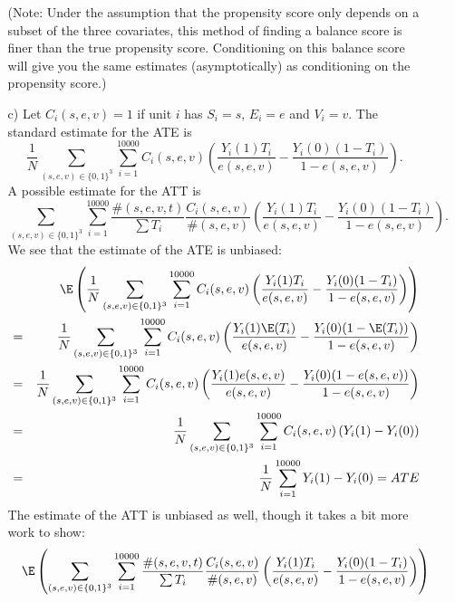 \documentclass{article}
\begin{document}
\begin{itemize}
\begin{itemize}
      (Note: Under the assumption that the propensity score only depends on a subset of
      the three covariates, this method of finding a balance
      score is finer than the true propensity score.  
      Conditioning on this balance score will give you the same estimates (asymptotically)
      as conditioning on the propensity score.)
    \item[c)]
      Let $C_i(s,e,v) = 1$ if unit $i$ has $S_i = s$, $E_i = e$ and $V_i = v$.
      The standard estimate for the ATE is
      $$
        \frac 1 N\sum_{(s,e,v) \in \{0,1\}^3}\sum_{i = 1}^{10000} C_{i}(s,e,v)\left(
          \frac{Y_i(1)T_i}{e(s,e,v)} - \frac{Y_i(0)(1-T_i)}{1- e(s,e,v)}
        \right).
      $$
      A possible estimate for the ATT is
      $$
       \sum_{(s,e,v) \in \{0,1\}^3}\sum_{i = 1}^{10000} \frac{\#(s,e,v,t)}{\sum T_i}\frac{C_{i}(s,e,v)}{\#(s,e,v)}\left(
          \frac{Y_i(1)T_i}{e(s,e,v)} - \frac{Y_i(0)(1-T_i)}{1- e(s,e,v)}
        \right).
      $$
      We see that the estimate of the ATE is unbiased:
      \begin{eqnarray*}
       && \E\left(\frac 1 N\sum_{(s,e,v) \in \{0,1\}^3}\sum_{i = 1}^{10000} C_{i}(s,e,v)\left(
          \frac{Y_i(1)T_i}{e(s,e,v)} - \frac{Y_i(0)(1-T_i)}{1- e(s,e,v)}
        \right)\right)\\
       &=&\frac 1 N\sum_{(s,e,v) \in \{0,1\}^3}\sum_{i = 1}^{10000} C_{i}(s,e,v)\left(
          \frac{Y_i(1)\E(T_i)}{e(s,e,v)} - \frac{Y_i(0)(1-\E(T_i))}{1- e(s,e,v)}
        \right)\\
      &=&\frac 1 N\sum_{(s,e,v) \in \{0,1\}^3}\sum_{i = 1}^{10000} C_{i}(s,e,v)\left(
          \frac{Y_i(1)e(s,e,v)}{e(s,e,v)} - \frac{Y_i(0)(1-e(s,e,v))}{1- e(s,e,v)}
        \right)\\
      &=&\frac 1 N\sum_{(s,e,v) \in \{0,1\}^3}\sum_{i = 1}^{10000} C_{i}(s,e,v)\left(
          Y_i(1) - Y_i(0)
        \right)\\
      & = &\frac 1 N\sum_{i = 1}^{10000}
          Y_i(1) - Y_i(0) = ATE\\
      \end{eqnarray*}
      The estimate of the ATT is unbiased as well, though it takes a bit more work to show:
      \begin{eqnarray*}
       &&\E\left(\sum_{(s,e,v) \in \{0,1\}^3}\sum_{i = 1}^{10000}
       \frac{\#(s,e,v,t)}{\sum T_i}\frac{C_{i}(s,e,v)}{\#(s,e,v)}
       \left(
          \frac{Y_i(1)T_i}{e(s,e,v)} - \frac{Y_i(0)(1-T_i)}{1- e(s,e,v)}
        \right)\right)\\

\end{eqnarray*}
\end{itemize}
\end{itemize}
\end{document}
